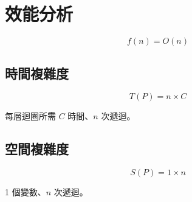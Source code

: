 \chapter{效能分析}

$$f(n)=O(n)$$

\section*{時間複雜度}

$$T(P)=n\times C$$

每層迴圈所需 $C$ 時間、$n$ 次遞迴。

\section*{空間複雜度}

$$S(P)=1\times n$$

1 個變數、$n$ 次遞迴。